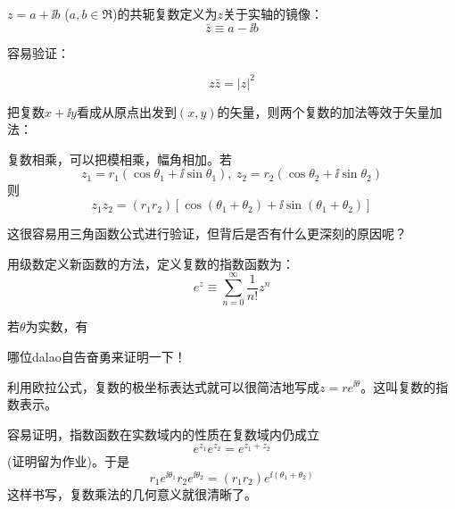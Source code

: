\documentclass[CJK]{beamer}
\begin{document}
\begin{frame}
\bch


$z = a+\ii b$ ($a, b\in \Re$)的共轭复数定义为$z$关于实轴的镜像：
$$\bar{z} \equiv a - \ii b$$

容易验证：

$$z\bar{z} = |z|^2$$
\emini
{}
\emini
\ech
\end{frame}

\begin{frame}
\bch
把复数$x+\ii y$看成从原点出发到$(x, y)$的矢量，则两个复数的加法等效于矢量加法：

\ech
\end{frame}

\begin{frame}
\bch

复数相乘，可以把模相乘，幅角相加。若
$$z_1=r_1(\cos\theta_1+\ii \sin\theta_1),\ z_2= r_2(\cos\theta_2+\ii \sin\theta_2)$$
则
$$z_1z_2 = (r_1r_2)\left[\cos(\theta_1+\theta_2) + \ii \sin(\theta_1+\theta_2)\right]$$

这很容易用三角函数公式进行验证，但背后是否有什么更深刻的原因呢？

\ech
\end{frame}


\begin{frame}
  \bch
  用级数定义新函数的方法，定义复数的指数函数为：
  $$ e^z\equiv \sum_{n=0}^\infty \frac{1}{n!}z^n$$
  \ech
\end{frame}

\begin{frame}
\bch
若$\theta$为实数，有


哪位dalao自告奋勇来证明一下！

\ech
\end{frame}


\begin{frame}
\bch
利用欧拉公式，复数的极坐标表达式就可以很简洁地写成$z = r e^{\ii \theta}$。这叫复数的指数表示。

容易证明，指数函数在实数域内的性质在复数域内仍成立
$$ e^{z_1}e^{z_2} = e^{z_1+z_2} $$
(证明留为作业)。于是
$$r_1e^{\ii\theta_1} r_2e^{\ii \theta_2} = (r_1r_2) e^{\ii(\theta_1+\theta_2)}$$
这样书写，复数乘法的几何意义就很清晰了。

\ech
\end{frame}
\end{document}
